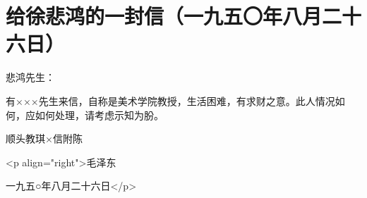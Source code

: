 \section[给徐悲鸿的一封信（一九五〇年八月二十六日）]{给徐悲鸿的一封信（一九五〇年八月二十六日）}


悲鸿先生：

有×××先生来信，自称是美术学院教授，生活困难，有求财之意。此人情况如何，应如何处理，请考虑示知为朌。

顺头教琪×信附陈

<p align="right">毛泽东

一九五○年八月二十六日</p>


